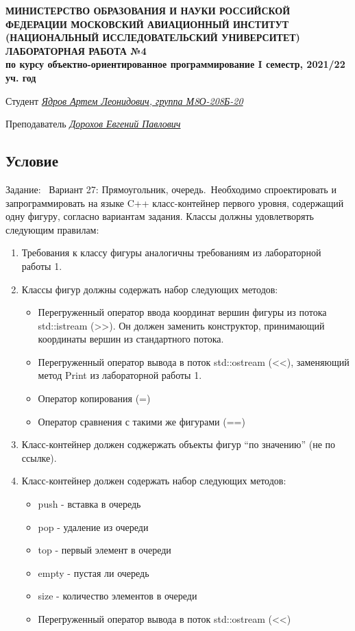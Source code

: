 \documentclass[12pt]{article}
\begin{document}
\begin{titlepage}
\begin{center}
\textbf{МИНИСТЕРСТВО ОБРАЗОВАНИЯ И НАУКИ РОССИЙСКОЙ ФЕДЕРАЦИИ
\medskip
МОСКОВСКИЙ АВИАЦИОННЫЙ ИНСТИТУТ
(НАЦИОНАЛЬНЫЙ ИССЛЕДОВАТЕЛЬСКИЙ УНИВЕРСИТЕТ)
\vfill\vfill
{\Huge ЛАБОРАТОРНАЯ РАБОТА №4} \\
по курсу объектно-ориентированное программирование
I семестр, 2021/22 уч. год}
\end{center}
\vfill

Студент \uline{\it {Ядров Артем Леонидович, группа М8О-208Б-20}\hfill}

Преподаватель \uline{\it {Дорохов Евгений Павлович}\hfill}

\vfill
\end{titlepage}

\subsection*{Условие}

Задание: \
Вариант 27: Прямоугольник, очередь.\
Необходимо спроектировать и запрограммировать на языке C++ класс-контейнер первого уровня, содержащий одну фигуру, согласно вариантам задания. Классы должны удовлетворять следующим правилам:
\begin{enumerate}
\item Требования к классу фигуры аналогичны требованиям из лабораторной работы 1.
\item Классы фигур должны содержать набор следующих методов:
\begin{itemize}
    \item Перегруженный оператор ввода координат вершин фигуры из потока std::istream (>>). Он должен заменить конструктор, принимающий координаты вершин из стандартного потока.
    \item Перегруженный оператор вывода в поток std::ostream (<<), заменяющий метод Print из лабораторной работы 1. 
    \item Оператор копирования (=)
    \item Оператор сравнения с такими же фигурами (==)
\end{itemize}
\item Класс-контейнер должен соджержать объекты фигур “по значению” (не по ссылке).
\item Класс-контейнер должен содержать набор следующих методов:
\begin{itemize}
	\item push - вставка в очередь
	\item pop - удаление из очереди
	\item top - первый элемент в очереди
	\item empty - пустая ли очередь
	\item size - количество элементов в очереди
	\item Перегруженный оператор вывода в поток std::ostream (<<)
\end{itemize}
\end{enumerate}
\end{document}
